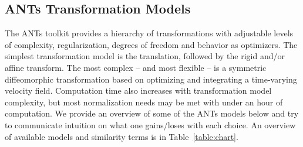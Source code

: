 \documentclass{InsightArticle}
\begin{document}
\subsection{ANTs Transformation Models}
The ANTs toolkit provides a hierarchy of transformations with
adjustable levels of complexity, regularization, degrees of freedom
and behavior as optimizers.  The simplest transformation model is the
translation, followed by the rigid and/or affine transform.  The most complex -- and most flexible
-- is a symmetric diffeomorphic transformation based on optimizing and
integrating a time-varying velocity field.  Computation time also
increases with transformation model complexity, but most normalization
needs may be met with under an hour of computation.  
We provide an overview of some of the ANTs models below and 
try to communicate intuition on what one gains/loses with each choice.  
An overview of available models and similarity terms is in Table~\ref{table:chart}.
\end{document}
